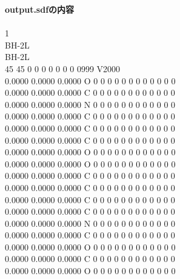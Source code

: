 \documentclass[11pt,titlepage,dvipdfmx,twoside]{jarticle}
\begin{document}
\begin{oframed}
{\bf output.sdfの内容}\\\\
{1                                                                          \\
BH-2L                                                                      \\
BH-2L                                                                      \\
 45 45  0  0  0  0  0  0  0  0999 V2000                                    \\
    0.0000    0.0000    0.0000  O  0  0  0  0  0  0  0  0  0  0  0  0      \\
    0.0000    0.0000    0.0000  C  0  0  0  0  0  0  0  0  0  0  0  0      \\
    0.0000    0.0000    0.0000  N  0  0  0  0  0  0  0  0  0  0  0  0      \\
    0.0000    0.0000    0.0000  C  0  0  0  0  0  0  0  0  0  0  0  0      \\
    0.0000    0.0000    0.0000  C  0  0  0  0  0  0  0  0  0  0  0  0      \\
    0.0000    0.0000    0.0000  C  0  0  0  0  0  0  0  0  0  0  0  0      \\
    0.0000    0.0000    0.0000  O  0  0  0  0  0  0  0  0  0  0  0  0      \\
    0.0000    0.0000    0.0000  O  0  0  0  0  0  0  0  0  0  0  0  0      \\
    0.0000    0.0000    0.0000  C  0  0  0  0  0  0  0  0  0  0  0  0      \\
    0.0000    0.0000    0.0000  C  0  0  0  0  0  0  0  0  0  0  0  0      \\
    0.0000    0.0000    0.0000  C  0  0  0  0  0  0  0  0  0  0  0  0      \\
    0.0000    0.0000    0.0000  C  0  0  0  0  0  0  0  0  0  0  0  0      \\
    0.0000    0.0000    0.0000  N  0  0  0  0  0  0  0  0  0  0  0  0      \\
    0.0000    0.0000    0.0000  C  0  0  0  0  0  0  0  0  0  0  0  0      \\
    0.0000    0.0000    0.0000  O  0  0  0  0  0  0  0  0  0  0  0  0      \\
    0.0000    0.0000    0.0000  C  0  0  0  0  0  0  0  0  0  0  0  0      \\
    0.0000    0.0000    0.0000  O  0  0  0  0  0  0  0  0  0  0  0  0      \\
}
\end{oframed}
\end{document}
